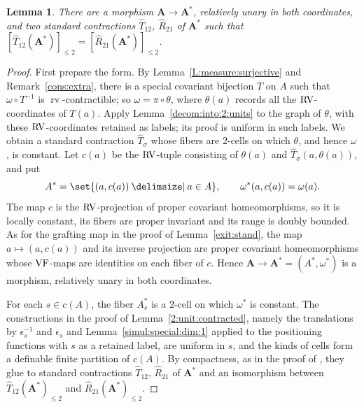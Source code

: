 \documentclass[12pt]{amsart}
\theoremstyle{plain}
\newtheorem{lem}[thm]{Lemma}
\theoremstyle{definition}
\theoremstyle{remark}
\numberwithin{equation}{section}
\theoremstyle{plain}
\newcommand{\VF}{\textup{VF}}
\newcommand{\RV}{\textup{RV}}
\newcommand{\0}{\emptyset}
\newcommand{\fun}{\longrightarrow}
\newcommand{\efun}{\longmapsto}
\providecommand\given{}
\newcommand\SetSymbol[1][]{%
\nonscript \: #1 \vert
\allowbreak
\nonscript\:
\mathopen{}}
\renewcommand\given{\SetSymbol[\delimsize]}
\DeclareMathOperator{\rv}{rv}
\begin{document}
\begin{lem}\label{subset:partitioned:2:unit:contracted}
There are a morphism $\bm A \fun \bm A^*$, relatively unary in both coordinates, and two standard contractions $\hat T_{12}$, $\hat R_{21}$ of $\bm A^*$ such that $[\hat T_{12}(\bm A^*)]_{\leq 2} = [\hat R_{21}(\bm A^*)]_{\leq 2}$.
\end{lem}
\begin{proof}
First prepare the form. By Lemma~\ref{L:measure:surjective} and Remark~\ref{cons:extra}, there is a special covariant bijection $T$ on $A$ such that $\omega \circ T^{-1}$ is $\rv$-contractible; so $\omega = \pi \circ \theta$, where $\theta(a)$ records all the $\RV$-coordinates of $T(a)$. Apply Lemma~\ref{decom:into:2:units} to the graph of $\theta$, with these $\RV$-coordinates retained as labels; its proof is uniform in such labels. We obtain a standard contraction $\hat T_\sigma$ whose fibers are $2$-cells on which $\theta$, and hence $\omega$, is constant. Let $c(a)$ be the $\RV$-tuple consisting of $\theta(a)$ and $\hat T_\sigma(a, \theta(a))$, and put
\[
A^* = \set{(a, c(a)) \given a \in A}, \qquad \omega^*(a, c(a)) = \omega(a).
\]
The map $c$ is the $\RV$-projection of proper covariant homeomorphisms, so it is locally constant, its fibers are proper invariant and its range is doubly bounded. As for the grafting map in the proof of Lemma~\ref{exit:stand}, the map $a \efun (a, c(a))$ and its inverse projection are proper covariant homeomorphisms whose $\VF$-maps are identities on each fiber of $c$. Hence $\bm A \fun \bm A^* = (A^*, \omega^*)$ is a morphism, relatively unary in both coordinates.

For each $s \in c(A)$, the fiber $A^*_s$ is a $2$-cell on which $\omega^*$ is constant. The constructions in the proof of Lemma~\ref{2:unit:contracted}, namely the translations by $\epsilon_s^{-1}$ and $\epsilon_s$ and Lemma~\ref{simul:special:dim:1} applied to the positioning functions with $s$ as a retained label, are uniform in $s$, and the kinds of cells form a definable finite partition of $c(A)$. By compactness, as in the proof of \cite[Corollary~5.8]{Yin:int:acvf}, they glue to standard contractions $\hat T_{12}$, $\hat R_{21}$ of $\bm A^*$ and an isomorphism between $\hat T_{12}(\bm A^*)_{\leq 2}$ and $\hat R_{21}(\bm A^*)_{\leq 2}$.


\end{proof}
\end{document}
